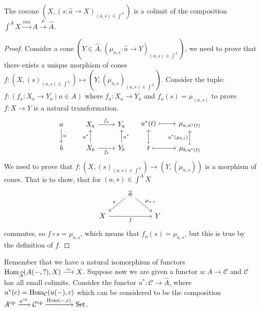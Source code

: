 \begin{prop}
    The cocone $(X, (s\colon \widehat{a} \to X)_ {(a,s)\in \int^A})$ is a colimit of the composition $\int^A X \xrightarrow{ can } A \xrightarrow{\mu}\widehat{A}$.
\end{prop}

\begin{proof}
    Consider a cone $(Y \in \widehat{A} , (\mu_{a,s} \colon \widehat{a} \to Y)_{(a,s) \in \int^A})$, we need to prove that there exists a unique morphism of  cones $f \colon (X, (s)_{(a,s) \in \int^A}) \mapsto (Y, (\mu_{a,s})_{(a,s) \in \int^A})$.
    Consider the tuple:
    $f \colon (f_a \colon X_a \to Y_a \mid a  \in A)$ where $f_a\colon X_a \to Y_a$ and $f_a(s)=\mu_{(a,s)}$ to prove $f:X \to Y$ is a natural transformation.
    \[
    \begin{tikzcd}
        a 
        \ar[d, "u"]
        &
        X_a
        \ar[r, "f_a"]
        &
        Y_a
        \\
        b
        &
        X_b
        \ar[r, "f_b"']
        \ar[u, "u^*"]
        &
        Y_b
        \ar[u, "u^*"']
    \end{tikzcd}
    \quad
    \begin{tikzcd}
        u^*(t)
        \ar[r, mapsto]
        &
        \mu_{a, u^*(t)}
        \\
        t
        \ar[u, mapsto]
        \ar[r, mapsto]
        &
        \mu_{b, u^*(t)}
        \ar[u, mapsto, "u^*(\mu_{b,t})"]
    \end{tikzcd}
    \]
    We need to prove that $f \colon (X, (s)_{(a,s) \in \int^A}) \to (Y,(\mu_{a,s}))$ is a morphism of cones.
    That is to show, that for $(a,s) \in \int^AX$ 
    \[
    \begin{tikzcd}
        &
        \widehat{a}
        \ar[rd,"{\mu_{a,s}}"]
        \ar[ld, "s"']
        \\
        X
        \ar[rr,"f"']
        &&
        Y
    \end{tikzcd}
    \] commutes, so $f \circ s = \mu_{a,s}$, which means that $f_a(s)=\mu_{a,s}$, but this is true by the definition of $f$.
\end{proof}

Remember that we have a natural isomorphism of functors $\Hom_{\widehat{A}}(A(-,?),X) \isomorphism X$. 
Suppose now we are given a functor $u \colon A  \to \mathcal{C}$ and $ \mathcal{ C } $ has all small colimits.
Consider the functor $u^*\colon \mathcal{C} \to \widehat{A}$, where $u^*(c) = \operatorname{Hom}_{\mathcal{C}}(u(-),c)$ which can be considered to be the composition $A^{\operatorname{op}} \xrightarrow{u^{\operatorname{op}}} \mathcal{C}^{\operatorname{op}} \xrightarrow{\operatorname{Hom}(-,c)}\operatorname{Set}$.

